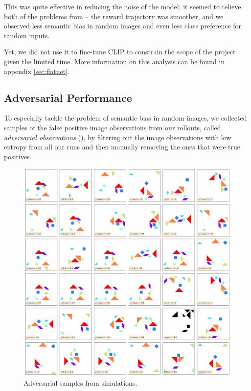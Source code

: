 This was quite effective in reducing the noise of the model; it seemed to relieve both of the problems from  -- the reward trajectory was smoother, and we observed less semantic bias in random images and even less class preference for random inputs.

Yet, we did not use it to fine-tune CLIP to constrain the scope of the project given the limited time.
More information on this analysis can be found in appendix \ref{sec:flatnet}.

\subsection{Adversarial Performance}
\label{sec:adversarial-performance}
To especially tackle the problem of semantic bias in random images, we collected samples of the false positive image observations from our rollouts, called \emph{adversarial observations} (), by filtering out the image observations with low entropy from all our runs and then manually removing the ones that were true positives.

\begin{figure}[h]
    \centering
    \includegraphics[width=\textwidth]{images/adversarial_samples.pdf}
    \caption{Adversarial samples from simulations.}
    \label{fig:semantic-bias-random}
\end{figure}

